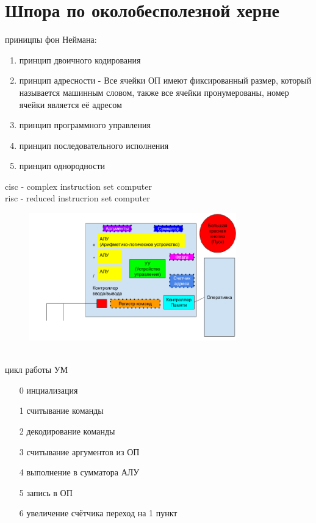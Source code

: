 \documentclass[a4paper,10pt]{article}
\begin{document}
\section*{Шпора по околобесполезной херне}
приницпы фон Неймана: \\
\begin{enumerate}
    \item принцип двоичного кодирования
    \item принцип адресности - Все ячейки ОП имеют фиксированный размер, который называется машинным словом, также все ячейки пронумерованы, номер ячейки является её адресом
    \item принцип программного управления
    \item принцип последовательного исполнения
    \item принцип однородности
\end{enumerate}
cisc - complex instruction set computer \\
risc - reduced instrucrion set computer \\
\begin{figure}[htbp]
    \includegraphics[width=0.8\textwidth]{УМвид.png}
\end{figure} \\
цикл работы УМ
\begin{enumerate}
    \item[0] инциализация
    \item[1] считывание команды
    \item[2] декодирование команды
    \item[3] считывание аргументов из ОП
    \item[4] выполнение в сумматора АЛУ
    \item[5] запись в ОП
    \item[6] увеличение счётчика переход на 1 пункт 
\end{enumerate}
\end{document}
